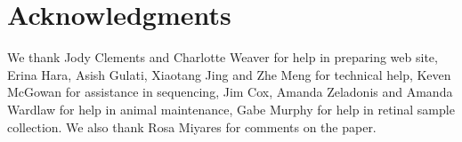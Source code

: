 \section{Acknowledgments}
We thank Jody Clements and Charlotte Weaver for help in preparing web site, Erina Hara, Asish Gulati, Xiaotang Jing and Zhe Meng for technical help, Keven McGowan for assistance in sequencing, Jim Cox, Amanda Zeladonis and Amanda Wardlaw for help in animal maintenance, Gabe Murphy for help in retinal sample collection. We also thank Rosa Miyares for comments on the paper. 